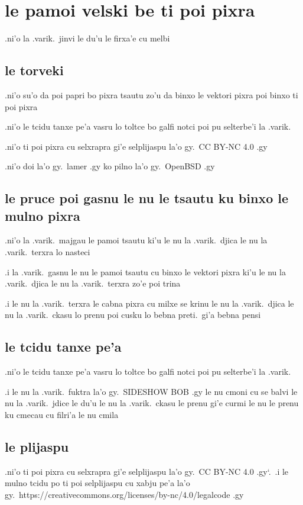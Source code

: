 \documentclass{report}
\newcommand\sds{\spacefactor\sfcode`.\ \space}
\begin{document}
\section{le pamoi velski be ti poi pixra}
.ni'o la .varik.\ jinvi le du'u le firxa'e cu melbi

\subsection{le torveki}
.ni'o su'o da poi papri bo pixra tsautu zo'u da binxo le vektori pixra poi binxo ti poi pixra

.ni'o le tcidu tanxe pe'a vasru lo toltce bo galfi notci poi pu selterbe'i la .varik.

.ni'o ti poi pixra cu selxrapra gi'e selplijaspu la'o gy.\ CC BY-NC 4.0 .gy

.ni'o doi la'o gy.\ lamer .gy ko pilno la'o gy.\ OpenBSD .gy

\subsection{le pruce poi gasnu le nu le tsautu ku binxo le mulno pixra}
.ni'o la .varik.\ majgau le pamoi tsautu ki'u le nu la .varik.\ djica le nu la .varik.\ terxra lo nasteci

.i la .varik.\ gasnu le nu le pamoi tsautu cu binxo le vektori pixra ki'u le nu la .varik.\ djica le nu la .varik.\ terxra zo'e poi trina

.i le nu la .varik.\ terxra le cabna pixra cu milxe se krinu le nu la .varik.\ djica le nu la .varik.\ ckasu lo prenu poi cusku lo bebna preti.\ gi'a bebna pensi

\subsection{le tcidu tanxe pe'a}
.ni'o le tcidu tanxe pe'a vasru lo toltce bo galfi notci poi pu selterbe'i la .varik.

.i le nu la .varik.\ fuktra la'o gy.\ SIDESHOW BOB .gy le nu cmoni cu se balvi le nu la .varik.\ jdice le du'u le nu la .varik.\ ckasu le prenu gi'e curmi le nu le prenu ku cmecau cu filri'a le nu cmila

\subsection{le plijaspu}
.ni'o ti poi pixra cu selxrapra gi'e selplijaspu la'o gy.\ CC BY-NC 4.0 .gy\sds  .i le mulno tcidu po ti poi selplijaspu cu xabju pe'a la'o gy.\ https://creativecommons.org/licenses/by-nc/4.0/legalcode .gy
\end{document}
